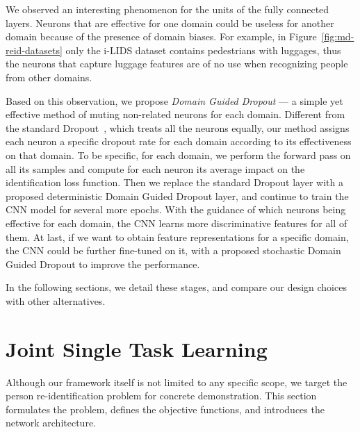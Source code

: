 We observed an interesting phenomenon for the units of the fully connected layers. Neurons that are effective for one domain could be useless for another domain because of the presence of domain biases. For example, in Figure~\ref{fig:md-reid-datasets} only the i-LIDS dataset contains pedestrians with luggages, thus the neurons that capture luggage features are of no use when recognizing people from other domains.

Based on this observation, we propose \emph{Domain Guided Dropout} --- a simple yet effective method of muting non-related neurons for each domain. Different from the standard Dropout~\cite{hinton2012improving}, which treats all the neurons equally, our method assigns each neuron a specific dropout rate for each domain according to its effectiveness on that domain. To be specific, for each domain, we perform the forward pass on all its samples and compute for each neuron its average impact on the identification loss function. Then we replace the standard Dropout layer with a proposed deterministic Domain Guided Dropout layer, and continue to train the CNN model for several more epochs. With the guidance of which neurons being effective for each domain, the CNN learns more discriminative features for all of them. At last, if we want to obtain feature representations for a specific domain, the CNN could be further fine-tuned on it, with a proposed stochastic Domain Guided Dropout to improve the performance.

In the following sections, we detail these stages, and compare our design choices with other alternatives.


\section{Joint Single Task Learning} %
\label{sec:md-method}
Although our framework itself is not limited to any specific scope, we target the person re-identification problem for concrete demonstration. This section formulates the problem, defines the objective functions, and introduces the network architecture.

